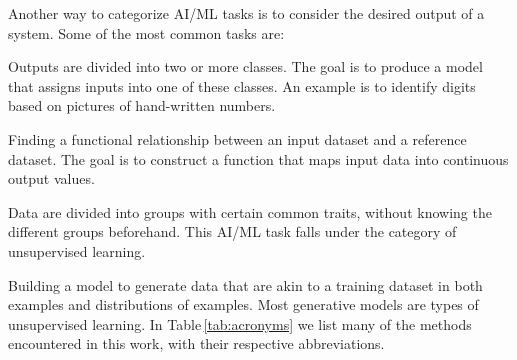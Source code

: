 \documentclass[../../main/main.tex]{subfiles}
\begin{document}
Another way to categorize AI/ML tasks is to consider the desired output of a system. Some of the most common tasks are:
\makeatletter
\renewenvironment{description}%
               {}%
               {\endlist}
\makeatother
\begin{description}
    \item[Classification] Outputs are divided into two or more classes. The goal is to produce a model that assigns inputs into one of these classes. An example is to identify digits based on pictures of hand-written numbers. 
\item[Regression] Finding a functional relationship between an input dataset and a reference dataset. The goal is to construct a function that maps input data into continuous output values.
\item[Clustering] Data are divided into groups with certain common traits, without knowing the different groups beforehand. This AI/ML task falls  under the category of unsupervised learning.
\item[Generation] Building a model to generate data that are akin to a training dataset in both examples and distributions of examples. Most generative models are types of unsupervised learning.
\end{description}
In Table\,\ref{tab:acronyms} we list many of the methods encountered in this work, with their respective abbreviations.
\end{document}
